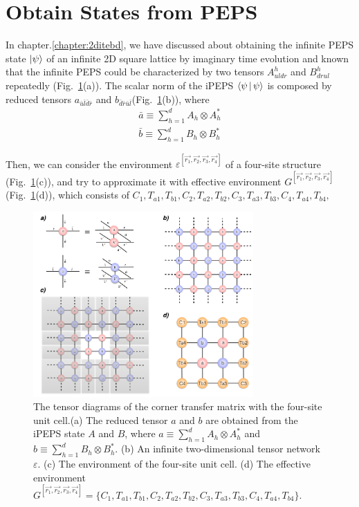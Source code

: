 \section{Obtain States from PEPS}
\label{2ditebdctm}
In chapter.\ref{chapter:2ditebd}, we have discussed about obtaining the infinite PEPS state $\Ket{\psi}$ of an infinite 2D square lattice by imaginary time evolution and known that the infinite PEPS could be characterized by two tensors $A^h_{uldr}$ and $B^h_{drul}$ repeatedly (Fig.~\ref{fig511}(a)). The scalar norm of the iPEPS $\Braket{\psi|\psi}$ is composed by reduced tensors $a_{\bar{u}\bar{l}\bar{d}\bar{r}}$ and $b_{\bar{d}\bar{r}\bar{u}\bar{l}}$(Fig.~\ref{fig511}(b)), where
\begin{align}
	\label{reduce_a}
	\bar{a} \equiv \sum_{h=1}^{d} A_{h} \otimes A^{*}_{h} \\
	\label{reduce_b}
	\bar{b} \equiv \sum_{h=1}^{d} B_{h} \otimes B^{*}_{h}
\end{align}

Then, we can consider the environment $\varepsilon^{\left[\vec{r_1},\vec{r_2},\vec{r_3},\vec{r_4}\right]}$ of a four-site structure (Fig.~\ref{fig511}(c)), and try to approximate it with effective environment $G^{\left[\vec{r_1},\vec{r_2},\vec{r_3},\vec{r_4}\right]}$ (Fig.~\ref{fig511}(d)), which consists of $C_1, T_{a1}, T_{b1},C_2, T_{a2}, T_{b2},C_3, T_{a3}, T_{b3},C_4, T_{a4}, T_{b4},$

\begin{figure}[ht]
	\centering
	\includegraphics[width=0.75\textwidth]{figures/fig511.png}
	\caption[The tensor diagrams of the corner transfer matrix with the four-site unit cell.]{The tensor diagrams of the corner transfer matrix with the four-site unit cell.(a) The reduced tensor $a$ and $b$ are obtained from the iPEPS state $A$ and $B$, where $a \equiv \sum_{h=1}^{d} A_{h} \otimes A^{*}_{h}$ and $b \equiv \sum_{h=1}^{d} B_{h} \otimes B^{*}_{h}$. (b) An infinite two-dimensional tensor network $\varepsilon$. (c) The environment of the four-site unit cell. (d) The effective environment $G^{\left[\vec{r_1},\vec{r_2},\vec{r_3},\vec{r_4}\right]} = \{ C_1, T_{a1}, T_{b1},C_2, T_{a2}, T_{b2},C_3, T_{a3}, T_{b3},C_4, T_{a4}, T_{b4}\}$.}
	\label{fig511}
\end{figure}

